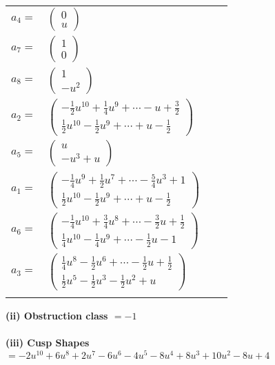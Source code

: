 \documentclass[1p]{elsarticle_modified}
\theoremstyle{definition}
\begin{document}
\begin{tabular}{m{7pt} m{180pt} m{7pt} m{180pt} }
\flushright $a_{4}=$&$\begin{pmatrix}0\\u\end{pmatrix}$ \\
\flushright $a_{7}=$&$\begin{pmatrix}1\\0\end{pmatrix}$ \\
\flushright $a_{8}=$&$\begin{pmatrix}1\\- u^2\end{pmatrix}$ \\
\flushright $a_{2}=$&$\begin{pmatrix}-\frac{1}{2} u^{10}+\frac{1}{4} u^9+\cdots- u+\frac{3}{2}\\\frac{1}{2} u^{10}-\frac{1}{2} u^9+\cdots+u-\frac{1}{2}\end{pmatrix}$ \\
\flushright $a_{5}=$&$\begin{pmatrix}u\\- u^3+u\end{pmatrix}$ \\
\flushright $a_{1}=$&$\begin{pmatrix}-\frac{1}{4} u^9+\frac{1}{2} u^7+\cdots-\frac{5}{4} u^3+1\\\frac{1}{2} u^{10}-\frac{1}{2} u^9+\cdots+u-\frac{1}{2}\end{pmatrix}$ \\
\flushright $a_{6}=$&$\begin{pmatrix}-\frac{1}{4} u^{10}+\frac{3}{4} u^8+\cdots-\frac{3}{2} u+\frac{1}{2}\\\frac{1}{4} u^{10}-\frac{1}{4} u^9+\cdots-\frac{1}{2} u-1\end{pmatrix}$ \\
\flushright $a_{3}=$&$\begin{pmatrix}\frac{1}{4} u^8-\frac{1}{2} u^6+\cdots-\frac{1}{2} u+\frac{1}{2}\\\frac{1}{2} u^5-\frac{1}{2} u^3-\frac{1}{2} u^2+u\end{pmatrix}$\\&\end{tabular}
\flushleft \textbf{(ii) Obstruction class $= -1$}\\~\\
\flushleft \textbf{(iii) Cusp Shapes $= -2 u^{10}+6 u^8+2 u^7-6 u^6-4 u^5-8 u^4+8 u^3+10 u^2-8 u+4$}\\~\\
\end{document}
